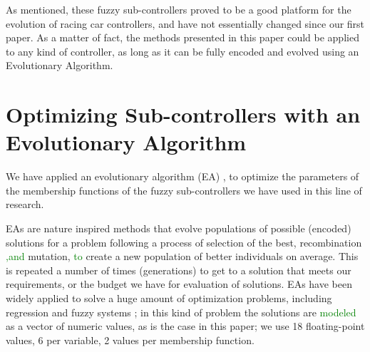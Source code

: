 \documentclass[10pt,journal,compsoc]{IEEEtran}
\begin{document}
As mentioned, these fuzzy sub-controllers proved to be a good platform for the evolution of racing car controllers, and have not essentially changed since our first paper. As a matter of fact, the methods presented in this paper could
be applied to any kind of controller, as long as it can be fully
encoded and evolved using an Evolutionary Algorithm. 

\section{Optimizing Sub-controllers with an Evolutionary Algorithm}
\label{sec:ga}

We have applied an evolutionary algorithm (EA) \cite{EAs_Back96}, to optimize the parameters of the membership functions of the fuzzy sub-controllers we have used in this line of research.

EAs are nature inspired methods that evolve populations of possible (encoded) solutions for a problem following a process of selection of the best,
recombination \textcolor{green}{,and} mutation, \textcolor{green}{to} create a new population of
better individuals on average. This is repeated a number of times
(generations) to get to a solution that meets our requirements, or the
budget we have for evaluation of solutions. EAs have been widely
applied to solve a huge amount of optimization problems, including regression and fuzzy systems \cite{hoffmann2001evolutionary}; in this kind of problem the solutions are \textcolor{green}{modeled} as a vector of numeric values, as is the
case in this paper; we use 18 floating-point values, 6 per variable, 2 values per membership function.




\end{document}
